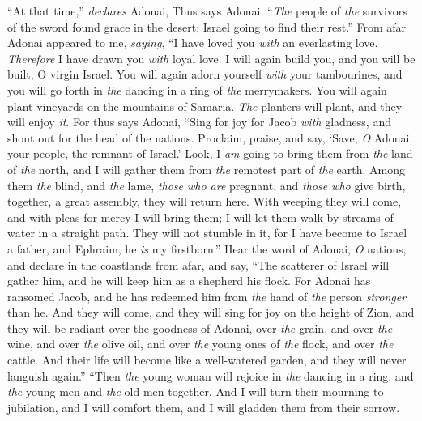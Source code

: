 \begin{biblechapter} %
\verse “At that time,” \textit{declares} Adonai,
\verse Thus says Adonai:
\verse “\textit{The} people of \textit{the} survivors of the sword found grace in the desert; 
Israel going to find their rest.”
\verse From afar Adonai appeared to me, \textit{saying}, 
“I have loved you \textit{with} an everlasting love. 
\textit{Therefore} I have drawn you \textit{with} loyal love.
\verse I will again build you, 
and you will be built, O virgin Israel. 
You will again adorn yourself \textit{with} your tambourines, 
and you will go forth in \textit{the} dancing in a ring of \textit{the} merrymakers.
\verse You will again plant vineyards on the mountains of Samaria. 
\textit{The} planters will plant, and they will enjoy \textit{it}.
\verse For thus says Adonai,
\verse “Sing for joy for Jacob \textit{with} gladness, 
and shout out for the head of the nations. 
Proclaim, praise, and say, 
‘Save, \textit{O} Adonai, your people, the remnant of Israel.’
\verse Look, I \textit{am} going to bring them from \textit{the} land of \textit{the} north, 
and I will gather them from \textit{the} remotest part of \textit{the} earth. 
Among them \textit{the} blind, and \textit{the} lame, 
\textit{those who are} pregnant, and \textit{those who} give birth, 
together, a great assembly, 
they will return here.
\verse With weeping they will come, 
and with pleas for mercy I will bring them; 
I will let them walk by streams of water in a straight path. 
They will not stumble in it, 
for I have become to Israel a father, 
and Ephraim, he \textit{is} my firstborn.”
\verse Hear the word of Adonai, \textit{O} nations, 
and declare in the coastlands from afar, and say, 
“The scatterer of Israel will gather him, 
and he will keep him as a shepherd his flock.
\verse For Adonai has ransomed Jacob, 
and he has redeemed him from \textit{the} hand of \textit{the} person \textit{stronger} than he.
\verse And they will come, 
and they will sing for joy on the height of Zion, 
and they will be radiant over the goodness of Adonai, 
over \textit{the} grain, and over \textit{the} wine, and over \textit{the} olive oil, 
and over \textit{the} young ones of \textit{the} flock, and over \textit{the} cattle. 
And their life will become like a well-watered garden, 
and they will never languish again.”
\verse “Then \textit{the} young woman will rejoice in \textit{the} dancing in a ring, 
and \textit{the} young men and \textit{the} old men together. 
And I will turn their mourning to jubilation, 
and I will comfort them, 
and I will gladden them from their sorrow.

\end{biblechapter}
